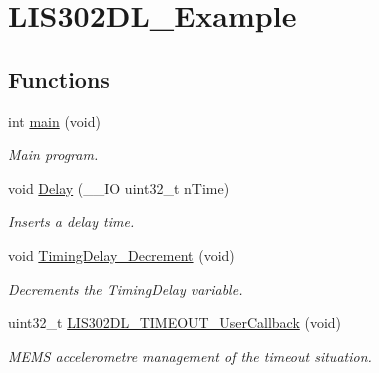 \hypertarget{group___l_i_s302_d_l___example}{\section{L\-I\-S302\-D\-L\-\_\-\-Example}
\label{group___l_i_s302_d_l___example}
}
\subsection*{Functions}
\begin{DoxyCompactItemize}
\item 
int \hyperlink{group___l_i_s302_d_l___example_ga840291bc02cba5474a4cb46a9b9566fe}{main} (void)
\begin{DoxyCompactList}\small\item\em Main program. \end{DoxyCompactList}\item 
void \hyperlink{group___l_i_s302_d_l___example_gadf6ebc82af142bc201d3eb70e107f52e}{Delay} (\-\_\-\-\_\-\-I\-O uint32\-\_\-t n\-Time)
\begin{DoxyCompactList}\small\item\em Inserts a delay time. \end{DoxyCompactList}\item 
void \hyperlink{group___l_i_s302_d_l___example_gaeb4c4307d28035637f0280cce42553fe}{Timing\-Delay\-\_\-\-Decrement} (void)
\begin{DoxyCompactList}\small\item\em Decrements the Timing\-Delay variable. \end{DoxyCompactList}\item 
uint32\-\_\-t \hyperlink{group___l_i_s302_d_l___example_ga6ebadd4ac5226151b229303db49d2c0a}{L\-I\-S302\-D\-L\-\_\-\-T\-I\-M\-E\-O\-U\-T\-\_\-\-User\-Callback} (void)
\begin{DoxyCompactList}\small\item\em M\-E\-M\-S accelerometre management of the timeout situation. \end{DoxyCompactList}\end{DoxyCompactItemize}
